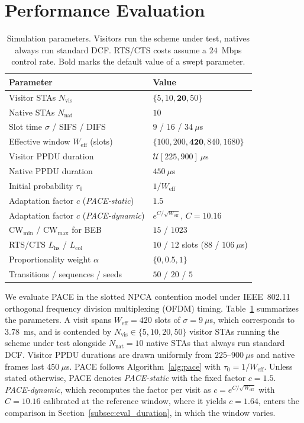 \documentclass[journal,10pt]{IEEEtran}
\newcommand{\Nvis}{N_\mathrm{vis}}
\newcommand{\Nnat}{N_\mathrm{nat}}
\begin{document}
\section{Performance Evaluation}
\label{sec:performance_evaluation}

\begin{table}[t]
\centering
\caption{Simulation parameters. Visitors run the scheme under test, natives always run standard DCF. RTS/CTS costs assume a $24$~Mbps control rate. Bold marks the default value of a swept parameter.}
\label{tab:sim_params}
\begin{tabular}{ll}
\hline
\textbf{Parameter} & \textbf{Value} \\
\hline
Visitor STAs $\Nvis$ & $\{5, 10, \mathbf{20}, 50\}$ \\
Native STAs $\Nnat$ & $10$ \\
Slot time $\sigma$ / SIFS / DIFS  & $9$ / $16$ / $34~\mu$s \\
Effective window $W_\mathrm{eff}$ (slots) & $\{100,200,\mathbf{420},840,1680\}$ \\
Visitor PPDU duration            & $\mathcal{U}[225, 900]~\mu$s \\
Native PPDU duration             & $450~\mu$s \\
Initial probability $\tau_0$     & $1/W_\mathrm{eff}$ \\
Adaptation factor $c$ (\emph{PACE-static}) & $1.5$ \\
Adaptation factor $c$ (\emph{PACE-dynamic}) & $e^{C/\sqrt{W_\mathrm{eff}}}$, $C=10.16$ \\
$\mathrm{CW}_{\min}$ / $\mathrm{CW}_{\max}$ for BEB & $15$ / $1023$ \\
RTS/CTS $L_\mathrm{hs}$ / $L_\mathrm{col}$ & $10$ / $12$ slots ($88$ / $106~\mu$s) \\
Proportionality weight $\alpha$ & $\{0, \mathbf{0.5}, 1\}$ \\
Transitions / sequences / seeds & $50$ / $20$ / $5$ \\
\hline
\end{tabular}
\end{table}

We evaluate PACE in the slotted NPCA contention model under IEEE~802.11 orthogonal frequency division multiplexing (OFDM) timing. Table~\ref{tab:sim_params} summarizes the parameters. A visit spans $W_\mathrm{eff}=420$ slots of $\sigma=9~\mu$s, which corresponds to $3.78$~ms, and is contended by $\Nvis\in\{5,10,20,50\}$ visitor STAs running the scheme under test alongside $\Nnat=10$ native STAs that always run standard DCF. Visitor PPDU durations are drawn uniformly from $225$--$900~\mu$s and native frames last $450~\mu$s. PACE follows Algorithm~\ref{alg:pace} with $\tau_0=1/W_\mathrm{eff}$. Unless stated otherwise, PACE denotes \emph{PACE-static} with the fixed factor $c=1.5$. \emph{PACE-dynamic}, which recomputes the factor per visit as $c=e^{C/\sqrt{W_\mathrm{eff}}}$ with $C=10.16$ calibrated at the reference window, where it yields $c=1.64$, enters the comparison in Section~\ref{subsec:eval_duration}, in which the window varies.
\end{document}
